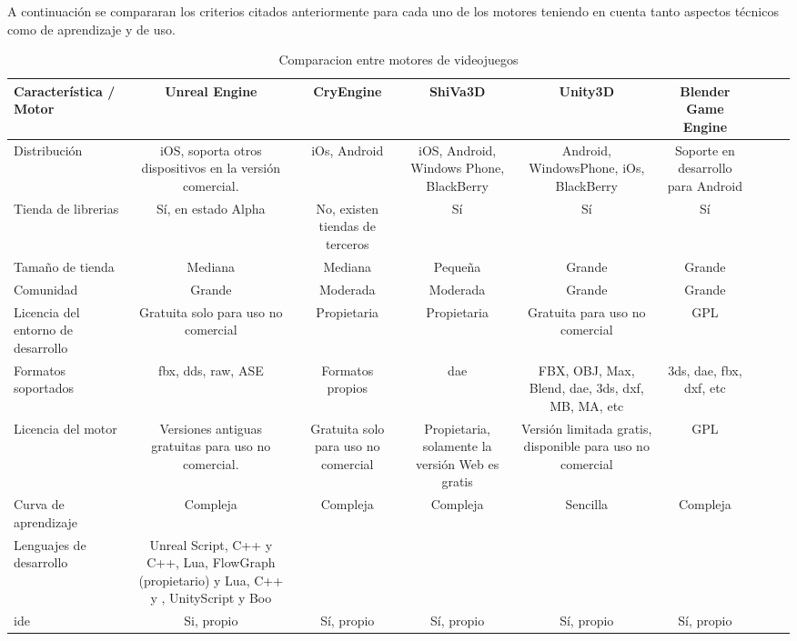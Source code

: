 A continuación se compararan los criterios citados anteriormente para cada uno de los
motores teniendo en cuenta tanto aspectos técnicos como de aprendizaje y de uso.



\begin{sidewaystable}
\begin{tabulary}{\textwidth}{L|CCCCCCCC}
\toprule
Característica / Motor &
Unreal Engine          &
CryEngine              &
ShiVa3D                &
Unity3D                &
Blender Game Engine \\
\midrule
Distribución & iOS, soporta otros dispositivos en la versión comercial. &
iOs, Android & iOS, Android, Windows Phone, BlackBerry & Android, WindowsPhone,
iOs, BlackBerry & Soporte en desarrollo para Android \\ 

Tienda de librerias & Sí, en estado Alpha & No, existen tiendas de
terceros & Sí & Sí & Sí \\

Tamaño de tienda & Mediana & Mediana & Pequeña & Grande & Grande \\

Comunidad & Grande & Moderada & Moderada & Grande & Grande \\
Licencia del entorno de desarrollo & Gratuita solo para uso no comercial &
Propietaria & Propietaria & Gratuita para uso no comercial & GPL \\

Formatos soportados & fbx, dds, raw, ASE & Formatos propios & dae & FBX, OBJ,
Max, Blend, dae, 3ds, dxf, MB, MA, etc & 3ds, dae, fbx, dxf, etc \\

Licencia del motor & Versiones antiguas gratuitas para uso no comercial.
& Gratuita solo para uso no comercial & Propietaria, solamente la versión Web es
gratis & Versión limitada gratis, disponible para uso no comercial & GPL \\

Curva de aprendizaje & Compleja & Compleja & Compleja & Sencilla & Compleja \\

Lenguajes de desarrollo & Unreal Script, C++ y C++, Lua, FlowGraph
(propietario) y Lua, C++ y \cs{}, UnityScript y Boo \\

\Gls{ide} & Si, propio & Sí, propio & Sí, propio & Sí, propio & Sí, propio \\
\bottomrule

\end{tabulary}
\caption{Comparacion entre motores de videojuegos}
\label{tab:comparacion_motores_juegos}
\end{sidewaystable}

